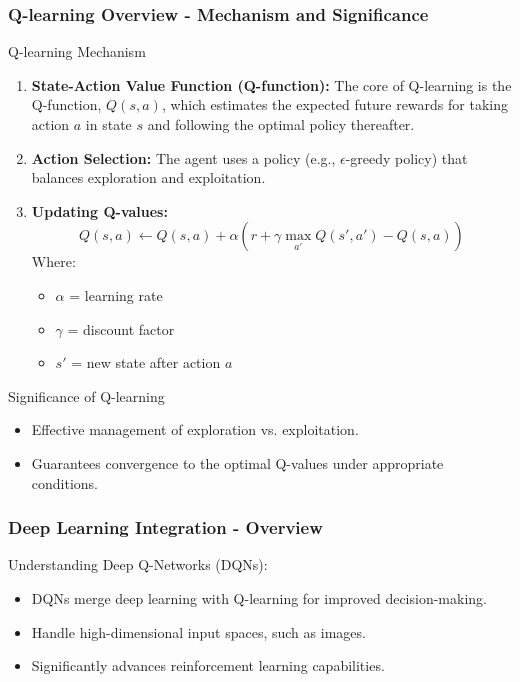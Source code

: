 \documentclass{beamer}
\begin{document}
\begin{frame}[fragile]
    \frametitle{Q-learning Overview - Mechanism and Significance}
    \begin{block}{Q-learning Mechanism}
        \begin{enumerate}
            \item \textbf{State-Action Value Function (Q-function):} 
            The core of Q-learning is the Q-function, \( Q(s, a) \), which estimates the expected future rewards for taking action \( a \) in state \( s \) and following the optimal policy thereafter.
            \item \textbf{Action Selection:} 
            The agent uses a policy (e.g., $\epsilon$-greedy policy) that balances exploration and exploitation.
            \item \textbf{Updating Q-values:} 
            \[
            Q(s, a) \leftarrow Q(s, a) + \alpha \left( r + \gamma \max_{a'} Q(s', a') - Q(s, a) \right)
            \]
            Where:
            \begin{itemize}
                \item \( \alpha \) = learning rate
                \item \( \gamma \) = discount factor
                \item \( s' \) = new state after action \( a \)
            \end{itemize}
        \end{enumerate}
    \end{block}
    
    \begin{block}{Significance of Q-learning}
        \begin{itemize}
            \item Effective management of exploration vs. exploitation.
            \item Guarantees convergence to the optimal Q-values under appropriate conditions.
        \end{itemize}
    \end{block}
\end{frame}

\begin{frame}[fragile]
    \frametitle{Deep Learning Integration - Overview}
    Understanding Deep Q-Networks (DQNs):
    \begin{itemize}
        \item DQNs merge deep learning with Q-learning for improved decision-making.
        \item Handle high-dimensional input spaces, such as images.
        \item Significantly advances reinforcement learning capabilities.
    \end{itemize}
\end{frame}
\end{document}
